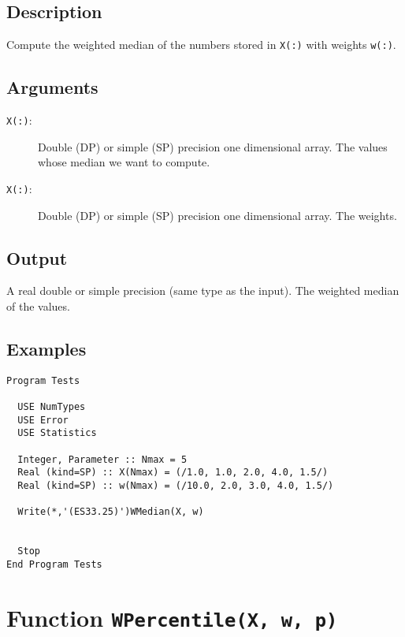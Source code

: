 \subsection{Description}

Compute the weighted median of the numbers stored in \texttt{X(:)}
with weights \texttt{w(:)}.

\subsection{Arguments}

\begin{description}
\item[\texttt{X(:)}:] Double (DP) or simple (SP) precision one
  dimensional array. The values  whose median we want to compute.
\item[\texttt{X(:)}:] Double (DP) or simple (SP) precision one
  dimensional array. The weights.
\end{description}

\subsection{Output}

A real double or simple precision (same type as the input). The
weighted median
of the values.

\subsection{Examples}

\begin{lstlisting}[emph=WMedian,
                   emphstyle=\color{blue},
                   frame=trBL,
                   caption=Computing the Weighted Median of a vector of numbers.,
                   label=wmean]
Program Tests

  USE NumTypes
  USE Error
  USE Statistics

  Integer, Parameter :: Nmax = 5
  Real (kind=SP) :: X(Nmax) = (/1.0, 1.0, 2.0, 4.0, 1.5/)  
  Real (kind=SP) :: w(Nmax) = (/10.0, 2.0, 3.0, 4.0, 1.5/)  

  Write(*,'(ES33.25)')WMedian(X, w)


  Stop
End Program Tests
\end{lstlisting}

\section{Function \texttt{WPercentile(X, w, p)}}

